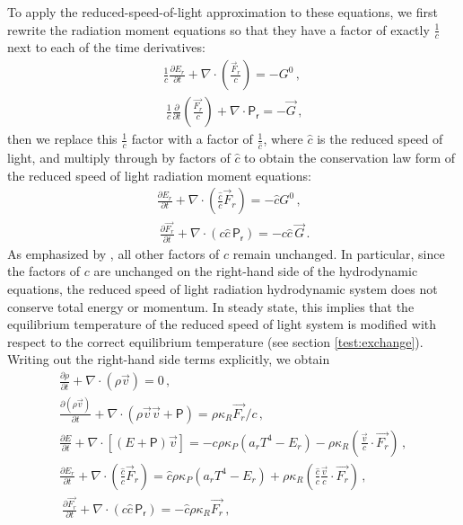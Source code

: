 \documentclass[fleqn,usenatbib]{mnras}
\begin{document}
To apply the reduced-speed-of-light approximation to these equations, we first rewrite the radiation moment equations so that they have a factor of exactly $\frac{1}{c}$ next to each of the time derivatives:
\begin{align}
    \frac{1}{c} \frac{\partial E_r}{\partial t} + \nabla \cdot \left( \frac{\vec{F}_r}{c} \right) = -G^0 \, , \\\
    \frac{1}{c} \frac{\partial}{\partial t} \left( \frac{\vec{F_r}}{c} \right) + \nabla \cdot \mathsf{P_r} = -\vec{G} \, ,
\end{align}
then we replace this $\frac{1}{c}$ factor with a factor of $\frac{1}{\hat c}$, where $\hat c$ is the reduced speed of light, and multiply through by factors of $\hat c$ to obtain the conservation law form of the reduced speed of light radiation moment equations:
\begin{align}
    \frac{\partial E_r}{\partial t} + \nabla \cdot \left( \frac{\hat c}{c} \vec{F}_r \right) = -\hat c G^0 \, , \\\
    \frac{\partial \vec{F_r}}{\partial t} + \nabla \cdot (c \hat c \, \mathsf{P_r}) = -c \hat c \, \vec{G} \, .
\end{align}
As emphasized by \cite{Skinner_2013}, all other factors of $c$ remain unchanged. In particular, since the factors of $c$ are unchanged on the right-hand side of the hydrodynamic equations, the reduced speed of light radiation hydrodynamic system does not conserve total energy or momentum. In steady state, this implies that the equilibrium temperature of the reduced speed of light system is modified with respect to the correct equilibrium temperature (see section \ref{test:exchange}). Writing out the right-hand side terms explicitly, we obtain
\begin{align}
    \frac{\partial \rho}{\partial t} + \nabla \cdot (\rho \vec{v}) = 0 \, , \\
    \frac{\partial (\rho \vec{v})}{\partial t} + \nabla \cdot (\rho \vec{v} \vec{v} + \mathsf{P}) = \rho \kappa_R {\vec{F_r} / c} \, , \\
    \frac{\partial E}{\partial t} + \nabla \cdot \left[(E + \mathsf{P})\vec{v}\right] = -c \rho \kappa_P (a_r T^4 - E_r) - \rho \kappa_R \left( \frac{\vec{v}}{c} \cdot \vec{F_r} \right) \, , \\
    \frac{\partial E_r}{\partial t} + \nabla \cdot \left( \frac{\hat c}{c} \vec{F}_r \right) = \hat c \rho \kappa_P  \left( a_r T^4 - E_r \right) + \rho \kappa_R \left( \frac{\hat c}{c} \frac{\vec{v}}{c} \cdot \vec{F_r} \right) \, , \\\
    \frac{\partial \vec{F_r}}{\partial t} + \nabla \cdot (c \hat c \, \mathsf{P_r}) = -\hat c \rho \kappa_R \vec{F_r} \, ,
\end{align}
\end{document}

